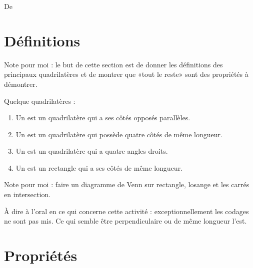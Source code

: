 

De \cite{NRHooXFvgpp5}

\section{Définitions}

Note pour moi : le but de cette section est de donner les définitions des principaux quadrilatères et de montrer que «tout le reste» sont des propriétés à démontrer.
\begin{definition}
    Quelque quadrilatères :
    \begin{enumerate}
        \item
            Un  est un quadrilatère qui a ses côtés opposés parallèles.
        \item
            Un  est un quadrilatère qui possède quatre côtés de même longueur.
        \item
            Un  est un quadrilatère qui a quatre angles droits.
        \item
            Un  est un rectangle qui a ses côtés de même longueur.
    \end{enumerate}
\end{definition}

Note pour moi : faire un diagramme de Venn sur rectangle, losange et les carrés en intersection.

À dire à l'oral en ce qui concerne cette activité : exceptionnellement les codages ne sont pas mis. Ce qui semble être perpendiculaire ou de même longueur l'est.


\section{Propriétés}

